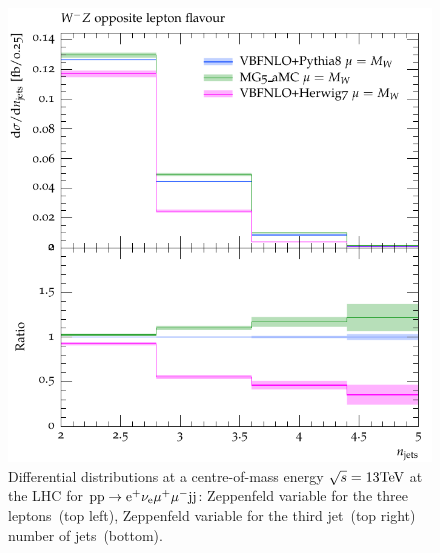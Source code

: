 \documentclass[11pt]{cernrep}
\begin{document}
\begin{figure}[htbp]
\begin{center}
   \includegraphics[scale=0.5]{figs/VBFNLO_WmZ_OF_nJets}
\caption{Differential distributions at a centre-of-mass energy $\sqrt{s}=13{\rm TeV}$ at the LHC for ${\rm p} {\rm p} \to {\rm e}^+  \nu_{\rm e}  \mu^+ \mu^- {\rm j} {\rm j}$: 
                Zeppenfeld variable for the three leptons~(top left),
                Zeppenfeld variable for the third jet~(top right)
                number of jets~(bottom).}
\label{vbs_fig_shower_1b}
\end{center}
\end{figure}
\end{document}

